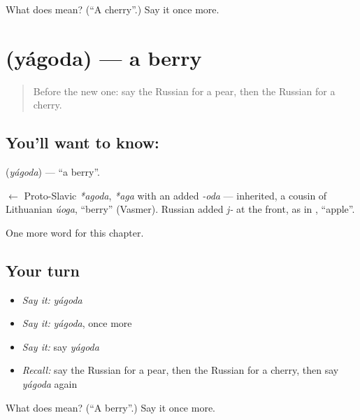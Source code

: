 \begin{tcolorbox}[breakable,colback=teal!4,colframe=teal!35!black,title={Before you move on}]
What does  mean? (\textquotedblleft{}A cherry\textquotedblright{}.) Say it once more.
\end{tcolorbox}
\section[\texorpdfstring{\ru{ягода} (yágoda)}{ягода (yágoda)}]{ (yágoda) — a berry}

\label{lesson:RU-C44-berry}



\begin{quote}
Before the new one: say the Russian for a pear, then the Russian for a cherry.
\end{quote}

\subsection*{You'll want to know: }
\textbf{} (\emph{yágoda}) — \textquotedblleft{}a berry\textquotedblright{}.

\begin{cousinweb}
\textbf{} $\leftarrow$ Proto-Slavic \emph{*agoda}, \emph{*aga} with an added \emph{-oda} — inherited, a cousin of Lithuanian \emph{úoga}, \textquotedblleft{}berry\textquotedblright{} (Vasmer). Russian added \emph{j-} at the front, as in \emph{}, \textquotedblleft{}apple\textquotedblright{}.
\end{cousinweb}

\begin{grammarlens}[title={What you've built}]
One more word for this chapter.
\end{grammarlens}

\subsection*{Your turn}
\begin{itemize}
\raggedright
  \item \emph{Say it:} \emph{yágoda}
  \item \emph{Say it:} \emph{yágoda}, once more
  \item \emph{Say it:} say \emph{yágoda}
  \item \emph{Recall:} say the Russian for a pear, then the Russian for a cherry, then say \emph{yágoda} again
\end{itemize}

\begin{tcolorbox}[breakable,colback=teal!4,colframe=teal!35!black,title={Before you move on}]
What does  mean? (\textquotedblleft{}A berry\textquotedblright{}.) Say it once more.
\end{tcolorbox}
